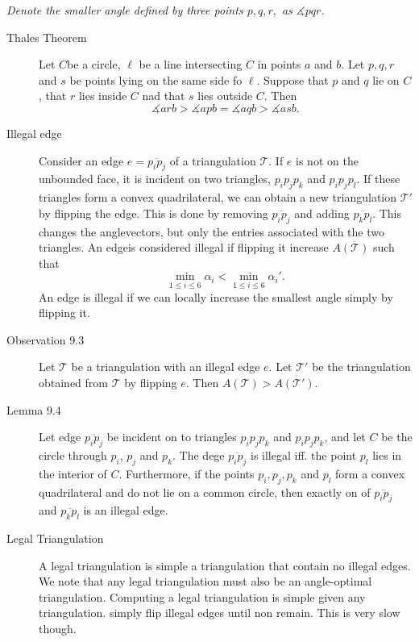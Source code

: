 \textit{Denote the smaller angle defined by three points $p,q,r,$ as
  $\measuredangle pqr$.}

\begin{description}
\item[Thales Theorem] Let $C$be a circle, $\ell$ be a line intersecting $C$ in
  points $a$ and $b$. Let $p, q, r$ and $s$ be points lying on the same side fo
  $\ell$. Suppose that $p$ and $q$ lie on $C$, that $r$ lies inside $C$ nad that
  $s$ lies outside $C$.  Then
  \[
    \measuredangle arb > \measuredangle apb = \measuredangle aqb > \measuredangle asb.
  \]

\item[Illegal edge] Consider an edge $e = \overline{p_ip_j}$ of a triangulation
  $\mathcal{T}$. If $e$ is not on the unbounded face, it is incident on two
  triangles, $p_ip_jp_k$ and $p_ip_jp_l$. If these triangles form a convex
  quadrilateral, we can obtain a new triangulation $\mathcal{T}'$ by flipping
  the edge. This is done by removing $\overline{p_ip_j}$ and adding
  $\overline{p_kp_l}$. This changes the anglevectors, but only the entries
  associated with the two triangles.  An edgeis considered illegal if flipping
  it increase $A(\mathcal{T})$ such that
  \[
    \underset{1\leq i \leq 6}{\min} \alpha_i < \underset{1\leq i\leq 6}{\min} \alpha_i'.
  \]
  An edge is illegal if we can locally increase the smallest angle simply by flipping it.

\item[Observation 9.3] Let $\mathcal{T}$ be a triangulation with an illegal edge
  $e$. Let $\mathcal{T}'$ be the triangulation obtained from $\mathcal{T}$ by
  flipping $e$. Then $A(\mathcal{T}) > A(\mathcal{T}')$.

\item[Lemma 9.4] Let edge $\overline{p_ip_j}$ be incident on to triangles
  $p_ip_jp_k$ and $p_ip_jp_k$, and let $C$ be the circle through $p_i$, $p_j$
  and $p_k$. The dege $\overline{p_ip_j}$ is illegal iff. the point $p_l$ lies
  in the interior of $C$.  Furthermore, if the points $p_i, p_j, p_k$ and $p_l$
  form a convex quadrilateral and do not lie on a common circle, then exactly on
  of $\overline{p_ip_j}$ and $\overline{p_kp_l}$ is an illegal edge.

\item[Legal Triangulation] A legal triangulation is simple a triangulation that
  contain no illegal edges. We note that any legal triangulation must also be an
  angle-optimal triangulation. Computing a legal triangulation is simple given
  any triangulation.  simply flip illegal edges until non remain. This is very
  slow though.
\end{description}



